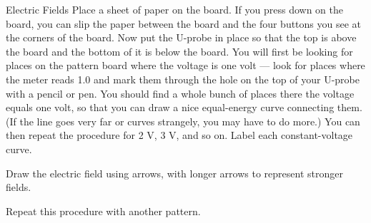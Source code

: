 \begin{lab}{Electric Fields}
Place a sheet of paper on the board.
If you press down on the board, you can slip the paper
between the board and the four buttons you see at the
corners of the board. Now put the U-probe in place so that
the top is above the board and the bottom of
it is below the board. You will first be looking for places
on the pattern board where the voltage is one volt --- look
for places where the meter reads 1.0 and mark them through
the hole on the top of your U-probe with a pencil or pen.
You should find a whole bunch of places there the voltage
equals one volt, so that you can draw a nice equal-energy
curve connecting them. (If the line goes very far or curves
strangely, you may have to do more.) You can then repeat the
procedure for 2 V, 3 V, and so on.  Label each
constant-voltage curve.

Draw the electric field using arrows, with longer arrows
to represent stronger fields.

Repeat this procedure with another pattern.

\end{lab}

